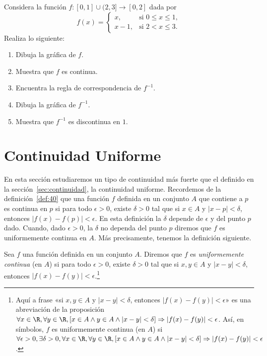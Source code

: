 \documentclass[12pt,a4paper]{book}
\begin{document}
    \begin{ejercicio}\label{ej:221}
        Considera la función $f:[0,1]\cup(2,3]\to[0,2]$ dada por
        \begin{equation*}
            f(x)=\begin{cases}
                x, & \text{si }0\leq x\leq 1,\\
                x-1, & \text{si }2<x\leq 3.
            \end{cases}
        \end{equation*}
        Realiza lo siguiente:
        \begin{enumerate}[nosep]
            \item Dibuja la gráfica de $f$.
            \item Muestra que $f$ es continua.
            \item Encuentra la regla de correspondencia de $f^{-1}$.
            \item Dibuja la gráfica de $f^{-1}$.
            \item Muestra que $f^{-1}$ es discontinua en $1$.
        \end{enumerate}
    \end{ejercicio}

    \section{Continuidad Uniforme}

    En esta sección estudiaremos un tipo de continuidad más fuerte que el
    definido en la sección~\ref{sec:continuidad}, la continuidad uniforme. Recordemos de la
    definición~\ref{def:40} que una función $f$ definida en un conjunto $A$ que contiene a $p$ es
    continua en $p$ si para todo $\epsilon>0$, existe $\delta>0$ tal que si $x\in A$ y $|x-p|<\delta$,
    entonces $|f(x)-f(p)|<\epsilon$. En esta definición la $\delta$ depende de $\epsilon$ y del punto
    $p$ dado. Cuando, dado $\epsilon>0$, la $\delta$ no dependa del punto $p$ diremos que $f$
    es uniformemente continua en $A$. Más precisamente, tenemos la definición
    siguiente.

    \begin{definicion}\label{def:43}
        Sea $f$ una función definida en un
        conjunto $A$. Diremos que $f$ es \textit{uniformemente continua} (en $A$) si para todo
        $\epsilon>0$, existe $\delta>0$ tal que si $x,y\in A$ y $|x-y|<\delta$, entonces $|f(x)-f(y)|<
        \epsilon$.\footnote{Aquí a frase «si $x,y\in A$ y $|x-y|<\delta$, entonces $|f(x)-f(y)|<\epsilon$» es una abreviación
        de la proposición $\forall x\in\R,\forall y\in\R,[x\in A\wedge y\in A\wedge|x-y|<\delta]\Rightarrow|f(x)-f(y)|<\epsilon$.
        Así, en símbolos, $f$ es uniformemente continua (en $A$) si $\forall\epsilon>0,\exists\delta>0,\forall x\in
        \R,\forall y\in\R,[x\in A\wedge y\in A\wedge|x-y|<\delta]\Rightarrow|f(x)-f(y)|<\epsilon$.}
    \end{definicion}
\end{document}
